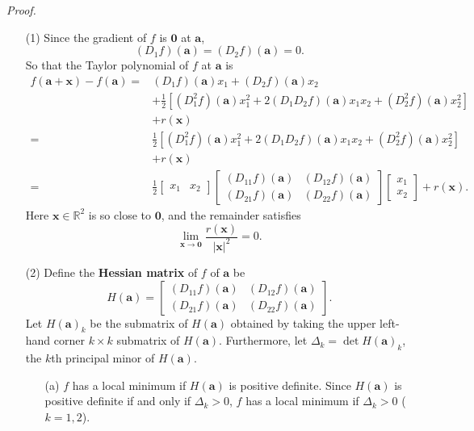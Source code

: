 \documentclass{article}
\begin{document}
\emph{Proof.}
\begin{enumerate}
\item[(1)]
  Since the gradient of $f$ is $\mathbf{0}$ at $\mathbf{a}$,
  \[
    (D_1 f)(\mathbf{a}) = (D_2 f)(\mathbf{a}) = 0.
  \]
  So that the Taylor polynomial of $f$ at $\mathbf{a}$ is
  \begin{align*}
    f(\mathbf{a}+\mathbf{x}) - f(\mathbf{a})
    =& (D_1 f)(\mathbf{a})x_1 + (D_2 f)(\mathbf{a})x_2 \\
      &+ \frac{1}{2}\left[
        (D_1^2 f)(\mathbf{a})x_1^2
        + 2(D_1 D_2 f)(\mathbf{a})x_1 x_2
        + (D_2^2 f)(\mathbf{a})x_2^2\right] \\
      &+ r(\mathbf{x}) \\
    =& \frac{1}{2}\left[
        (D_1^2 f)(\mathbf{a})x_1^2
        + 2(D_1 D_2 f)(\mathbf{a})x_1 x_2
        + (D_2^2 f)(\mathbf{a})x_2^2\right] \\
      &+ r(\mathbf{x}) \\
    =& \frac{1}{2}
        \begin{bmatrix}
          x_1 & x_2
        \end{bmatrix}
        \begin{bmatrix}
          (D_{11}f)(\mathbf{a}) & (D_{12}f)(\mathbf{a}) \\
          (D_{21}f)(\mathbf{a}) & (D_{22}f)(\mathbf{a})
        \end{bmatrix}
        \begin{bmatrix}
          x_1 \\
          x_2
        \end{bmatrix}
      + r(\mathbf{x}).
  \end{align*}
  Here $\mathbf{x} \in \mathbb{R}^2$ is so close to $\mathbf{0}$,
  and the remainder satisfies
  \[
    \lim_{\mathbf{x} \to \mathbf{0}} \frac{r(\mathbf{x})}{|\mathbf{x}|^{2}} = 0.
  \]

\item[(2)]
  Define the \textbf{Hessian matrix} of $f$ of $\mathbf{a}$ be
  \[
    H(\mathbf{a}) = \begin{bmatrix}
      (D_{11}f)(\mathbf{a}) & (D_{12}f)(\mathbf{a}) \\
      (D_{21}f)(\mathbf{a}) & (D_{22}f)(\mathbf{a})
    \end{bmatrix}.
  \]
  Let $H(\mathbf{a})_k$ be the submatrix of $H(\mathbf{a})$ obtained by
  taking the upper left-hand corner $k \times k$ submatrix of $H(\mathbf{a})$.
  Furthermore, let $\Delta_k = \det H(\mathbf{a})_k$, the $k$th principal
  minor of $H(\mathbf{a})$.
  \begin{enumerate}
  \item[(a)]
    $f$ has a local minimum if $H(\mathbf{a})$ is positive definite.
    Since $H(\mathbf{a})$ is positive definite if and only if
    $\Delta_k > 0$,
    $f$ has a local minimum if $\Delta_k > 0$ ($k = 1, 2$).


\end{enumerate}
\end{enumerate}
\end{document}
